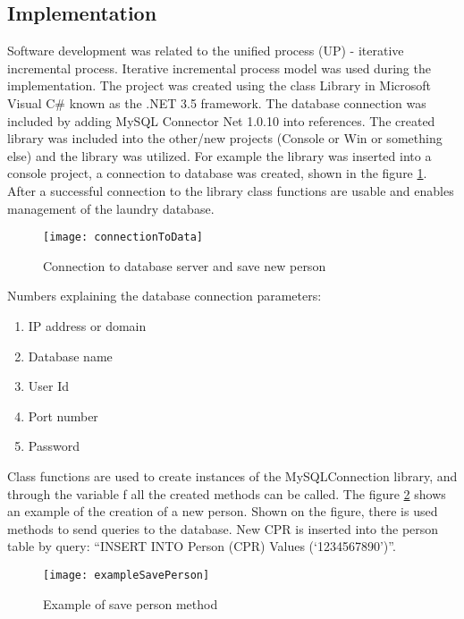 \newpage
\subsection{Implementation}

Software development was related to the unified process (UP) - iterative incremental process.  Iterative incremental process model \cite{bib5} was used during the implementation.  
The project was created using the class Library in Microsoft Visual C\# known as the .NET 3.5 framework. The database connection was included by adding MySQL Connector Net 1.0.10 into references. The created library was included into the other/new projects (Console or Win or something else) and the library was utilized. For example the library was  inserted into a console project, a connection to database was created, shown in the figure \ref{fig:connectionToData}. After a successful connection to the library class functions are usable and enables management of the laundry database.

\begin{figure}[h]
	\centering
		\texttt{[image: connectionToData]}
	\caption{Connection to database server and save new person}
	\label{fig:connectionToData}
\end{figure}

Numbers explaining the database connection parameters:

\begin{enumerate}
	\item IP address or domain
	\item Database name
	\item User Id
	\item Port number
	\item Password
\end{enumerate}

Class functions are used to create instances of the MySQLConnection library, and through the variable f all the created methods can be called. The figure \ref{fig:exampleSavePerson} shows an example of the creation of a new person. Shown on the figure, there is used methods to send queries to the database. New CPR is inserted into the person table by query: “INSERT INTO Person (CPR) Values (‘1234567890’)”.

\begin{figure}[h]
	\centering
		\texttt{[image: exampleSavePerson]}
	\caption{Example of save person method}
	\label{fig:exampleSavePerson}
\end{figure}